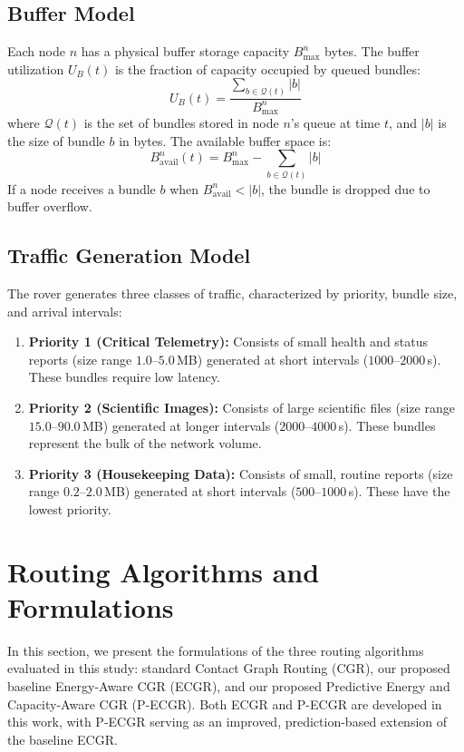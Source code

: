 \documentclass[a4paper,fleqn]{cas-dc}
\begin{document}
\subsection{Buffer Model}
Each node $n$ has a physical buffer storage capacity $B_{\max}^n$ bytes. The buffer utilization $U_B(t)$ is the fraction of capacity occupied by queued bundles:
\begin{equation}
    U_B(t) = \frac{\sum_{b \in \mathcal{Q}(t)} |b|}{B_{\max}^n}
\end{equation}
where $\mathcal{Q}(t)$ is the set of bundles stored in node $n$'s queue at time $t$, and $|b|$ is the size of bundle $b$ in bytes. The available buffer space is:
\begin{equation}
    B_{\text{avail}}^n(t) = B_{\max}^n - \sum_{b \in \mathcal{Q}(t)} |b|
\end{equation}
If a node receives a bundle $b$ when $B_{\text{avail}}^n < |b|$, the bundle is dropped due to buffer overflow.

\subsection{Traffic Generation Model}
The rover generates three classes of traffic, characterized by priority, bundle size, and arrival intervals:
\begin{enumerate}
    \item \textbf{Priority 1 (Critical Telemetry):} Consists of small health and status reports (size range $1.0$--$5.0\,$MB) generated at short intervals ($1000$--$2000\,$s). These bundles require low latency.
    \item \textbf{Priority 2 (Scientific Images):} Consists of large scientific files (size range $15.0$--$90.0\,$MB) generated at longer intervals ($2000$--$4000\,$s). These bundles represent the bulk of the network volume.
    \item \textbf{Priority 3 (Housekeeping Data):} Consists of small, routine reports (size range $0.2$--$2.0\,$MB) generated at short intervals ($500$--$1000\,$s). These have the lowest priority.
\end{enumerate}

\section{Routing Algorithms and Formulations}
\label{sec:ecgr}

In this section, we present the formulations of the three routing algorithms evaluated in this study: standard Contact Graph Routing (CGR), our proposed baseline Energy-Aware CGR (ECGR), and our proposed Predictive Energy and Capacity-Aware CGR (P-ECGR). Both ECGR and P-ECGR are developed in this work, with P-ECGR serving as an improved, prediction-based extension of the baseline ECGR.
\end{document}
